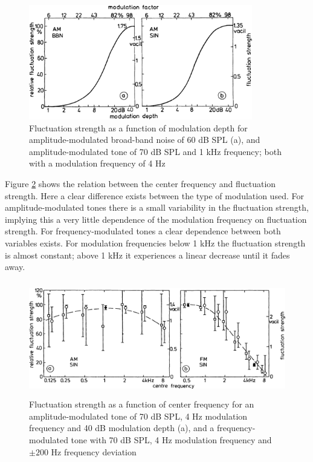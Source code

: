 \begin{figure}
    \centering
    \includegraphics[height=5cm]
        {img/FluctuationStrengthVsModulationDepth}
    \caption{Fluctuation strength as a function of modulation depth for
        amplitude-modulated broad-band noise of 60 dB SPL (a), and
        amplitude-modulated tone of 70 dB SPL and 1 kHz frequency; both with a
        modulation frequency of 4 Hz \cite[pp. 249]{Fastl2007Psychoacoustics}}
    \label{fig:flucstrenvsmoddep}
\end{figure}

Figure \ref{fig:flucstrenvscfreq} shows the relation between the center
frequency and fluctuation strength. Here a clear difference exists between the
type of modulation used. For amplitude-modulated tones there is a small
variability in the fluctuation strength, implying this a very little dependence
of the modulation frequency on fluctuation strength. For frequency-modulated
tones a clear dependence between both variables exists. For modulation
frequencies below 1 kHz the fluctuation strength is almost constant; above 1 kHz
it experiences a linear decrease until it fades away.

\begin{figure}
    \centering
    \includegraphics[height=5cm]
        {img/FluctuationStrengthVsCenterFrequency}
    \caption{Fluctuation strength as a function of center frequency for an
        amplitude-modulated tone of 70 dB SPL, 4 Hz modulation frequency and 40
        dB modulation depth (a), and a frequency-modulated tone with 70 dB SPL,
        4 Hz modulation frequency and $\pm200$ Hz frequency deviation
        \cite[pp. 250]{Fastl2007Psychoacoustics}}
    \label{fig:flucstrenvscfreq}
\end{figure}

